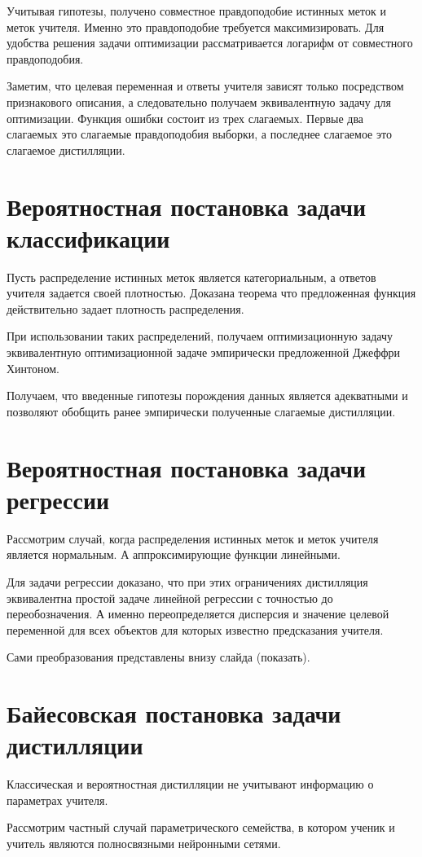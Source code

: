 \documentclass[10pt, twoside]{article}
\begin{document}
Учитывая гипотезы, получено совместное правдоподобие истинных меток и меток учителя. Именно это правдоподобие требуется максимизировать. Для удобства решения задачи оптимизации рассматривается логарифм от совместного правдоподобия.

Заметим, что целевая переменная и ответы учителя зависят только посредством признакового описания, а следовательно получаем эквивалентную задачу для оптимизации. Функция ошибки состоит из трех слагаемых. Первые два слагаемых это слагаемые правдоподобия выборки, а последнее слагаемое это слагаемое дистилляции.

\section{Вероятностная постановка задачи классификации}
Пусть распределение истинных меток является категориальным, а ответов учителя задается своей плотностью. Доказана теорема что предложенная функция действительно задает плотность распределения.

При использовании таких распределений, получаем оптимизационную задачу эквивалентную оптимизационной задаче эмпирически предложенной Джеффри Хинтоном.

Получаем, что введенные гипотезы порождения данных является адекватными и позволяют обобщить ранее эмпирически полученные слагаемые дистилляции.

\section{Вероятностная постановка задачи регрессии}
Рассмотрим случай, когда распределения истинных меток и меток учителя является нормальным. А аппроксимирующие функции линейными.

Для задачи регрессии доказано, что при этих ограничениях дистилляция эквивалентна простой задаче линейной регрессии с точностью до переобозначения. А именно переопределяется дисперсия и значение целевой переменной для всех объектов для которых известно предсказания учителя.

Сами преобразования представлены внизу слайда (показать). 

\section{Байесовская постановка задачи дистилляции}
Классическая и вероятностная дистилляции не учитывают информацию о параметрах учителя.

Рассмотрим частный случай параметрического семейства, в котором ученик и учитель являются полносвязными нейронными сетями.
\end{document}
